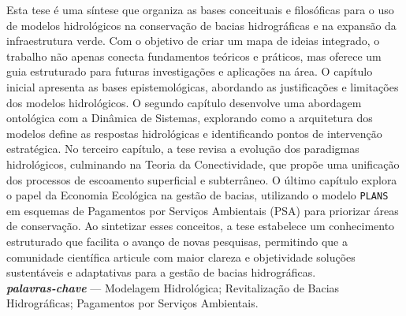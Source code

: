 \documentclass[./main.tex]{subfiles}
\begin{document}
\large

\newpage
\renewcommand{\headrulewidth}{0pt}
\thispagestyle{fancy}
\fancyhf{} %
\fancyfoot{} %
\fancyfoot[C]{\thepage}

\begin{center}
    \vspace{5mm}
\end{center}
\singlespacing
\normalsize
Esta tese é uma síntese que organiza as bases conceituais e filosóficas para o uso de modelos hidrológicos na conservação de bacias hidrográficas e na expansão da infraestrutura verde. Com o objetivo de criar um mapa de ideias integrado, o trabalho não apenas conecta fundamentos teóricos e práticos, mas oferece um guia estruturado para futuras investigações e aplicações na área. O capítulo inicial apresenta as bases epistemológicas, abordando as justificações e limitações dos modelos hidrológicos. O segundo capítulo desenvolve uma abordagem ontológica com a Dinâmica de Sistemas, explorando como a arquitetura dos modelos define as respostas hidrológicas e identificando pontos de intervenção estratégica. No terceiro capítulo, a tese revisa a evolução dos paradigmas hidrológicos, culminando na Teoria da Conectividade, que propõe uma unificação dos processos de escoamento superficial e subterrâneo. O último capítulo explora o papel da Economia Ecológica na gestão de bacias, utilizando o modelo \texttt{PLANS} em esquemas de Pagamentos por Serviços Ambientais (PSA) para priorizar áreas de conservação. Ao sintetizar esses conceitos, a tese estabelece um conhecimento estruturado que facilita o avanço de novas pesquisas, permitindo que a comunidade científica articule com maior clareza e objetividade soluções sustentáveis e adaptativas para a gestão de bacias hidrográficas.\\[2ex]
	
\noindent \textit{\textbf{palavras-chave}} --- Modelagem Hidrológica; Revitalização de Bacias Hidrográficas; Pagamentos por Serviços Ambientais.
\clearpage
\end{document}
